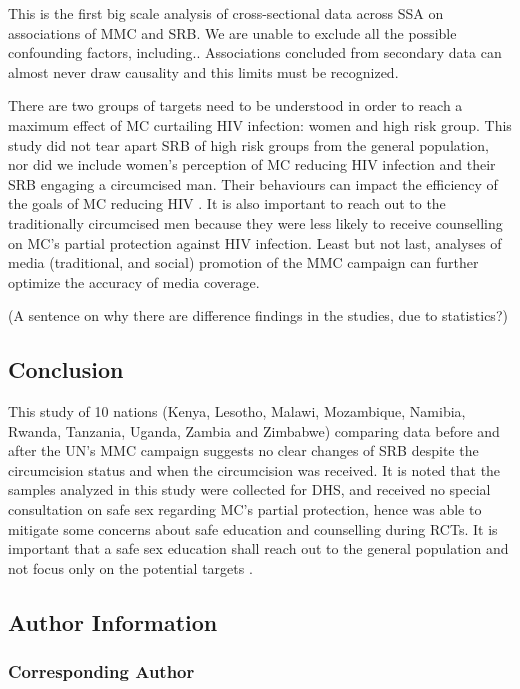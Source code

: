 \documentclass[12pt,]{article}
\begin{document}
This is the first big scale analysis of cross-sectional data across SSA
on associations of MMC and SRB. We are unable to exclude all the
possible confounding factors, including.. Associations concluded from
secondary data can almost never draw causality and this limits must be
recognized.

There are two groups of targets need to be understood in order to reach
a maximum effect of MC curtailing HIV infection: women and high risk
group. This study did not tear apart SRB of high risk groups from the
general population, nor did we include women's perception of MC reducing
HIV infection and their SRB engaging a circumcised man. Their behaviours
can impact the efficiency of the goals of MC reducing HIV
\autocites{AlsaCash09}{DushPato11}{HallSing08}{WaweMaku09}{WeisHank09}.
It is also important to reach out to the traditionally circumcised men
because they were less likely to receive counselling on MC's partial
protection against HIV infection. Least but not last, analyses of media
(traditional, and social) promotion of the MMC campaign can further
optimize the accuracy of media coverage.

(A sentence on why there are difference findings in the studies, due to
statistics?)

\subsection{Conclusion}\label{conclusion}

This study of 10 nations (Kenya, Lesotho, Malawi, Mozambique, Namibia,
Rwanda, Tanzania, Uganda, Zambia and Zimbabwe) comparing data before and
after the UN's MMC campaign suggests no clear changes of SRB despite the
circumcision status and when the circumcision was received. It is noted
that the samples analyzed in this study were collected for DHS, and
received no special consultation on safe sex regarding MC's partial
protection, hence was able to mitigate some concerns about safe
education and counselling during RCTs. It is important that a safe sex
education shall reach out to the general population and not focus only
on the potential targets \autocite{EatoCain11}.

\subsection{Author Information}\label{author-information}

\subsubsection{Corresponding Author}\label{corresponding-author}
\end{document}
